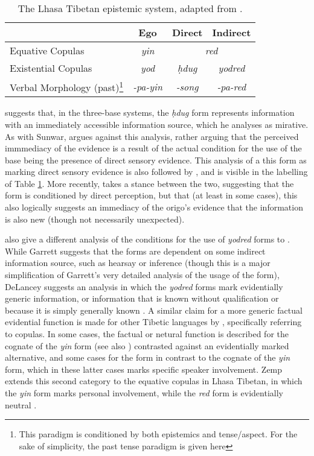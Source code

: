 \begin{table}
        \begin{tabular}{l|c|c|c}
         & Ego & Direct & Indirect \\ \hline
        Equative Copulas & \textit{yin} & \multicolumn{2}{c}{\textit{red}} \\
        Existential Copulas & \textit{yod} & \textit{ḥdug} & \textit{yodred} \\
        Verbal Morphology (past)\footnote{This paradigm is conditioned by both epistemics and tense/aspect. For the sake of simplicity, the past tense paradigm is given here} & \textit{-pa-yin} & \textit{-song} & \textit{-pa-red}
        \end{tabular}
        \caption{The Lhasa Tibetan epistemic system, adapted from .}\label{t:Description:LhasaEpistemics}
 \end{table}

 suggests that, in the three-base systems, the \textit{ḥdug} form represents information with an immediately accessible information source, which he analyses as mirative. As with Sunwar,  argues against this analysis, rather arguing that the perceived immmediacy of the evidence is a result of the actual condition for the use of the base being the presence of direct sensory evidence. This analysis of a this form as marking direct sensory evidence is also followed by , and is visible in the labelling of Table \ref{t:Description:LhasaEpistemics}. More recently,  takes a stance between the two, suggesting that the form is conditioned by direct perception, but that (at least in some cases), this also logically suggests an immediacy of the origo's evidence that the information is also new (though not necessarily unexpected).

 also give a different analysis of the conditions for the use of \textit{yodred} forms to . While Garrett suggests that the forms are dependent on some indirect information source, such as hearsay or inference (though this is a major simplification of Garrett's very detailed analysis of the usage of the form), DeLancey suggests an analysis in which the \textit{yodred} forms mark evidentially generic information, or information that is known without qualification or because it is simply generally known \cite[392]{DeLancey2017Tibetan}. A similar claim for a more generic factual evidential function is made for other Tibetic languages by , specifically referring to copulas. In some cases, the factual or netural function is described for the cognate of the \textit{yin} form (see also ) contrasted against an evidentially marked alternative, and some cases for the form in contrast to the cognate of the \textit{yin} form, which in these latter cases marks specific speaker involvement. Zemp extends this second category to the equative copulas in Lhasa Tibetan, in which the \textit{yin} form marks personal involvement, while the \textit{red} form is evidentially neutral \cite[39]{Zemp2020}.

